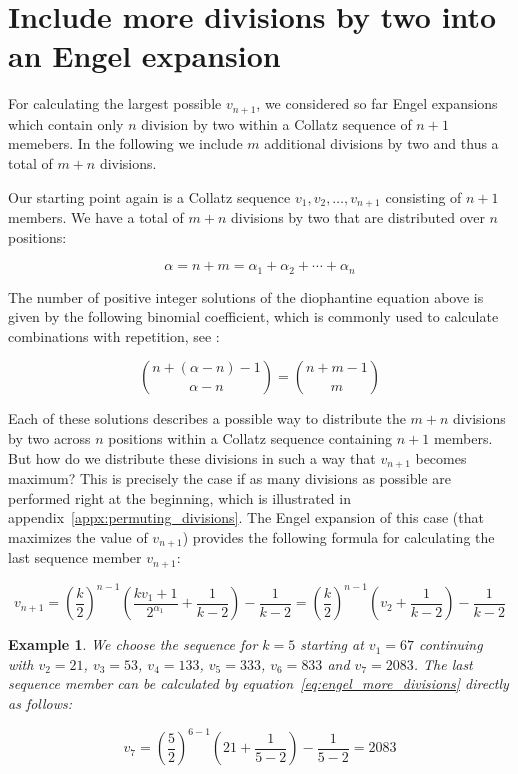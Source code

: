 \documentclass[12pt]{amsart}
\newtheorem{example}[theorem]{Example}
\theoremstyle{definition}
\begin{document}
\section{Include more divisions by two into an Engel expansion}
\label{sec:include_divisions_engel_expansion}
For calculating the largest possible $v_{n+1}$, we considered so far Engel expansions which contain only $n$ division by two within a Collatz sequence of $n+1$ memebers. In the following we include $m$ additional divisions by two and thus a total of $m+n$ divisions.

\par\medskip
Our starting point again is a Collatz sequence $v_1,v_2,\ldots,v_{n+1}$ consisting of $n+1$ members. We have a total of $m+n$ divisions by two that are distributed over $n$ positions:

\begin{equation}
\label{eq:alpha_n_m}
\alpha=n+m=\alpha_1+\alpha_2+\cdots+\alpha_n
\end{equation}

The number of positive integer solutions of the diophantine equation above is given by the following binomial coefficient, which is commonly used to calculate combinations with repetition, see \cite[p.~54]{Ref_Brualdi_2010}:

\[
\binom{n+(\alpha-n)-1}{\alpha-n}=\binom{n+m-1}{m}
\]

\par\medskip
Each of these solutions describes a possible way to distribute the $m+n$ divisions by two across $n$ positions within a Collatz sequence containing $n+1$ members. But how do we distribute these divisions in such a way that $v_{n+1}$ becomes maximum? This is precisely the case if as many divisions as possible are performed right at the beginning, which is illustrated in appendix~\ref{appx:permuting_divisions}. The Engel expansion of this case (that maximizes the value of $v_{n+1}$) provides the following formula for calculating the last sequence member $v_{n+1}$:

\begin{equation}
\label{eq:engel_more_divisions}
v_{n+1}=\left(\frac{k}{2}\right)^{n-1}\left(\frac{kv_1+1}{2^{\alpha_1}}+\frac{1}{k-2}\right)-\frac{1}{k-2}=\left(\frac{k}{2}\right)^{n-1}\left(v_2+\frac{1}{k-2}\right)-\frac{1}{k-2}
\end{equation}

\medskip
\begin{example}
	\label{ex:engel_67}
	We choose the sequence for $k=5$ starting at $v_1=67$ continuing with $v_2=21$, $v_3=53$, $v_4=133$, $v_5=333$, $v_6=833$ and $v_7=2083$. The last sequence member can be calculated by equation~\ref{eq:engel_more_divisions} directly as follows:
	
	\[
	v_7=\left(\frac{5}{2}\right)^{6-1}\left(21+\frac{1}{5-2}\right)-\frac{1}{5-2}=2083
	\]
\end{example}
\end{document}
